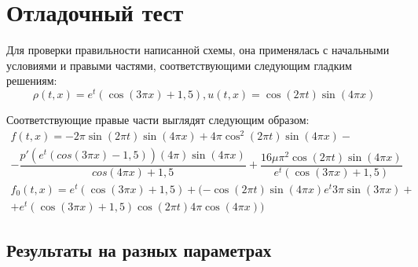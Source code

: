 \section{Отладочный тест}

Для проверки правильности написанной схемы, она применялась с начальными условиями и правыми частями, соответствующими следующим гладким решениям:
\begin{equation*}
    \rho(t, x) = e^t(\cos(3\pi x) + 1,\!5), u(t, x) = \cos(2\pi t)\sin(4\pi x)
\end{equation*}

Соответствующие правые части выглядят следующим образом:
\begin{gather*}
    f (t, x) = -2\pi \sin(2\pi t)\sin(4\pi x) + 4\pi\cos^2(2\pi t)\sin(4\pi x) - \\
    - \dfrac{p'(e^t(cos(3\pi x) - 1\!,5))(4\pi)\sin(4\pi x)}{cos(4\pi x) + 1,\!5} + \dfrac{16\mu\pi^2\cos(2\pi t)\sin(4\pi x)
    }{e^t(\cos(3\pi x) + 1,\!5)}   \\
    f_0 (t, x) = e^t(\cos(3\pi x) + 1,\!5) + (-\cos(2\pi t)\sin(4\pi x)e^t3\pi\sin(3\pi x) +\\
    + e^t(\cos(3\pi x) + 1,\!5)\cos(2\pi t)4\pi\cos(4\pi x))
\end{gather*}

\subsection{Результаты на разных параметрах}

